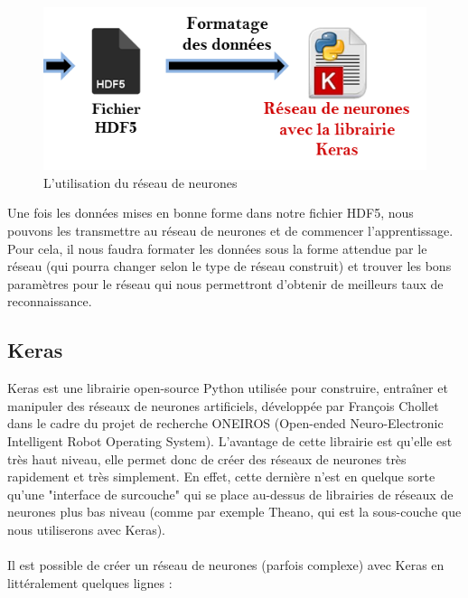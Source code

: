 \documentclass{article}
\begin{document}
\hphantom{.}
\begin{figure}[h]
  \centerline{\includegraphics[scale=0.9]{img/schema_reseau_keras.png}}
  \caption{L'utilisation du réseau de neurones}
\end{figure}

Une fois les données mises en bonne forme dans notre fichier HDF5, nous pouvons les transmettre au réseau de neurones et de commencer l'apprentissage. Pour cela, il nous faudra formater les données sous la forme attendue par le réseau (qui pourra changer selon le type de réseau construit) et trouver les bons paramètres pour le réseau qui nous permettront d'obtenir de meilleurs taux de reconnaissance.

\subsection{Keras}

Keras\cite{docKeras} est une librairie open-source Python utilisée pour construire, entraîner et manipuler des réseaux de neurones artificiels, développée par François Chollet dans le cadre du projet de recherche ONEIROS (Open-ended Neuro-Electronic Intelligent Robot Operating System). L'avantage de cette librairie est qu'elle est très haut niveau, elle permet donc de créer des réseaux de neurones très rapidement et très simplement. En effet, cette dernière n'est en quelque sorte qu'une "interface de surcouche" qui se place au-dessus de librairies de réseaux de neurones plus bas niveau (comme par exemple Theano\cite{docTheano}, qui est la sous-couche que nous utiliserons avec Keras).\\
 \\
Il est possible de créer un réseau de neurones (parfois complexe) avec Keras en littéralement quelques lignes :\\

\end{document}
